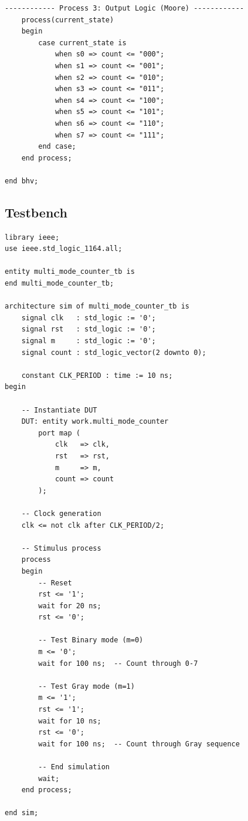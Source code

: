 \documentclass[12pt,a4paper]{article}
\begin{document}
\begin{lstlisting}[caption={multi\_mode\_counter.vhd}]
    ------------ Process 3: Output Logic (Moore) ------------
    process(current_state)
    begin
        case current_state is
            when s0 => count <= "000";
            when s1 => count <= "001";
            when s2 => count <= "010";
            when s3 => count <= "011";
            when s4 => count <= "100";
            when s5 => count <= "101";
            when s6 => count <= "110";
            when s7 => count <= "111";
        end case;
    end process;

end bhv;
\end{lstlisting}

\subsection{Testbench}

\begin{lstlisting}[caption={multi\_mode\_counter\_tb.vhd}]
library ieee;
use ieee.std_logic_1164.all;

entity multi_mode_counter_tb is
end multi_mode_counter_tb;

architecture sim of multi_mode_counter_tb is
    signal clk   : std_logic := '0';
    signal rst   : std_logic := '0';
    signal m     : std_logic := '0';
    signal count : std_logic_vector(2 downto 0);
    
    constant CLK_PERIOD : time := 10 ns;
begin

    -- Instantiate DUT
    DUT: entity work.multi_mode_counter
        port map (
            clk   => clk,
            rst   => rst,
            m     => m,
            count => count
        );

    -- Clock generation
    clk <= not clk after CLK_PERIOD/2;

    -- Stimulus process
    process
    begin
        -- Reset
        rst <= '1';
        wait for 20 ns;
        rst <= '0';
        
        -- Test Binary mode (m=0)
        m <= '0';
        wait for 100 ns;  -- Count through 0-7
        
        -- Test Gray mode (m=1)
        m <= '1';
        rst <= '1';
        wait for 10 ns;
        rst <= '0';
        wait for 100 ns;  -- Count through Gray sequence
        
        -- End simulation
        wait;
    end process;

end sim;
\end{lstlisting}

\newpage
\end{document}
